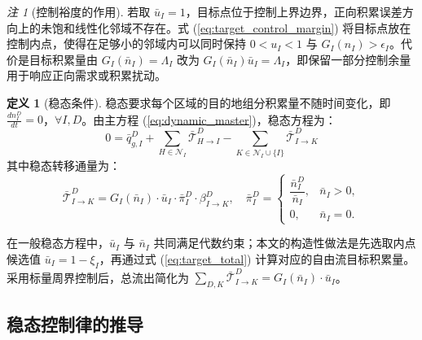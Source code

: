 \documentclass[a4paper,12pt]{article}
\theoremstyle{plain}
\theoremstyle{definition}
\newtheorem{definition}[theorem]{定义}
\theoremstyle{remark}
\newtheorem{remark}[theorem]{注}
\begin{document}
\begin{remark}[控制裕度的作用]\label{rem:control_margin}
若取 $\bar u_I=1$，目标点位于控制上界边界，正向积累误差方向上的未饱和线性化邻域不存在。式 (\ref{eq:target_control_margin}) 将目标点放在控制内点，使得在足够小的邻域内可以同时保持 $0<u_I<1$ 与 $G_I(n_I)>\epsilon_I$。代价是目标积累量由 $G_I(\bar n_I)=\Lambda_I$ 改为 $G_I(\bar n_I)\bar u_I=\Lambda_I$，即保留一部分控制余量用于响应正向需求或积累扰动。
\end{remark}

\begin{definition}[稳态条件]\label{def:steady_state}
稳态要求每个区域的目的地组分积累量不随时间变化，即 $\frac{dn_I^D}{dt} = 0$，$\forall I, D$。由主方程 (\ref{eq:dynamic_master})，稳态方程为：
\begin{equation}\label{eq:steady_state_eq}
    0 = \bar{q}_{g,I}^D + \sum_{H \in \mathcal{N}_I} \bar{\mathcal{T}}_{H \to I}^D - \sum_{K \in \mathcal{N}_I \cup \{I\}} \bar{\mathcal{T}}_{I \to K}^D
\end{equation}
其中稳态转移通量为：
\begin{equation}\label{eq:steady_transfer}
    \bar{\mathcal{T}}_{I \to K}^D = G_I(\bar{n}_I) \cdot \bar{u}_I \cdot \bar\pi_I^D \cdot \beta_{I \to K}^D,
    \quad
    \bar\pi_I^D=
    \begin{cases}
    \dfrac{\bar n_I^D}{\bar n_I}, & \bar n_I>0,\\[0.8em]
    0, & \bar n_I=0 .
    \end{cases}
\end{equation}
\end{definition}

在一般稳态方程中，$\bar u_I$ 与 $\bar n_I$ 共同满足代数约束；本文的构造性做法是先选取内点候选值 $\bar u_I=1-\xi_I$，再通过式 (\ref{eq:target_total}) 计算对应的自由流目标积累量。采用标量周界控制后，总流出简化为 $\sum_{D,K} \bar{\mathcal{T}}_{I \to K}^D = G_I(\bar{n}_I) \cdot \bar{u}_I$。

\subsection{稳态控制律的推导}
\end{document}
